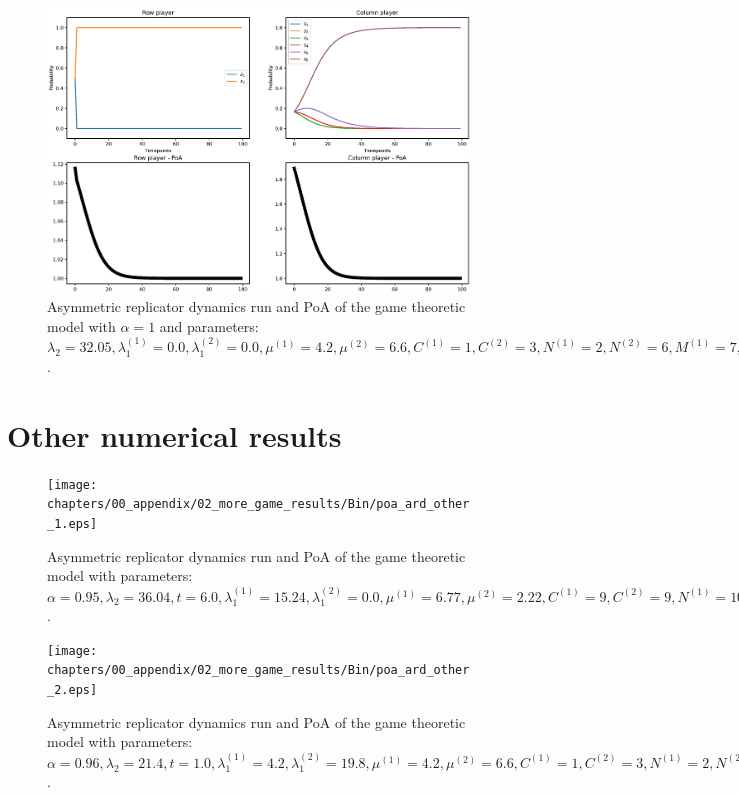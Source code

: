 \begin{figure}[H]
    \includegraphics[width=\textwidth, trim = 0 60 0 60, clip]{chapters/00_appendix/02_more_game_results/Bin/poa_ard_alpha_1.eps}
    \caption{Asymmetric replicator dynamics run and PoA of the game theoretic
    model with \(\alpha = 1\) and parameters: \(\lambda_2 = 32.05,
    \lambda_1^{(1)} = 0.0, \lambda_1^{(2)} = 0.0, \mu^{(1)} = 4.2,
    \mu^{(2)} = 6.6, C^{(1)} = 1, C^{(2)} = 3, N^{(1)} = 2, N^{(2)} = 6,
    M^{(1)} = 7, M^{(2)} = 4, t = 2.0\).}
    \label{fig:poa_ard_alpha_1}
\end{figure}


\section{Other numerical results}\label{app:b_3}


\begin{figure}[H]
    \texttt{[image: chapters/00\_appendix/02\_more\_game\_results/Bin/poa\_ard\_other\_1.eps]}
    \caption{Asymmetric replicator dynamics run and PoA of the game theoretic
    model with parameters: \(\alpha = 0.95, \lambda_2 = 36.04, t = 6.0,
    \lambda_1^{(1)} = 15.24, \lambda_1^{(2)} = 0.0, \mu^{(1)} = 6.77,
    \mu^{(2)} = 2.22, C^{(1)} = 9, C^{(2)} = 9, N^{(1)} = 10, N^{(2)} = 9,
    M^{(1)} = 4, M^{(2)} = 3\).}
    \label{fig:poa_ard_other_1}
\end{figure}


\begin{figure}[H]
    \texttt{[image: chapters/00\_appendix/02\_more\_game\_results/Bin/poa\_ard\_other\_2.eps]}
    \caption{Asymmetric replicator dynamics run and PoA of the game theoretic
    model with parameters: \(\alpha = 0.96, \lambda_2 = 21.4, t = 1.0,
    \lambda_1^{(1)} = 4.2, \lambda_1^{(2)} = 19.8, \mu^{(1)} = 4.2,
    \mu^{(2)} = 6.6, C^{(1)} = 1, C^{(2)} = 3, N^{(1)} = 2, N^{(2)} = 6,
    M^{(1)} = 7, M^{(2)} = 4\).}
    \label{fig:poa_ard_other_2}
\end{figure}


